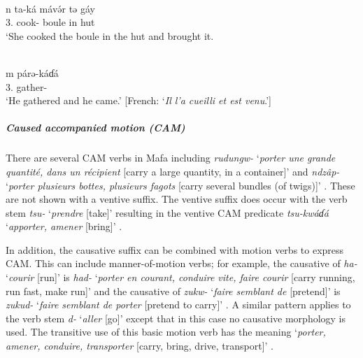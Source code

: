 \ea\label{ex2:mafa3}
 \\
\gll  n ta-ká mávə́r tə gáy	\\
3. cook- boule in hut \\
\glt `She cooked the boule in the hut and brought it.  

\ex\label{ex2:mafa4}
 \\
\gll  m párə-káɗá	\\
3. gather-\\
\glt `He gathered and he came.' [French: `\textit{Il l'a cueilli et est venu}.']
\z 

\subparagraph{Caused accompanied motion (CAM)}

There are several CAM verbs in Mafa including \textit{rudungw-} `\textit{porter une grande quantité, dans un récipient} [carry a large quantity, in a container]' and \textit{ndzâp-} `\textit{porter plusieurs bottes, plusieurs fagots} [carry several bundles (of twigs)]' \citep[291, 314]{barreteauLexiqueMafaLangue1990}. These are not shown with a ventive suffix. The ventive suffix does occur with the verb stem \textit{tsu-} `\textit{prendre} [take]' resulting in the ventive CAM predicate \textit{tsu-kwáɗá} `\textit{apporter, amener} [bring]' \citep[359]{barreteauLexiqueMafaLangue1990}.

\largerpage[-2]
In addition, the causative suffix can be combined with motion verbs to express CAM. This can include manner-of-motion verbs; for example, the causative of \textit{ha-} `\textit{courir} [run]' is \textit{had-} `\textit{porter en courant, conduire vite, faire courir} [carry running, run fast, make run]' and the causative of \textit{zukw-} `\textit{faire semblant de} [pretend]' is \textit{zukud-} `\textit{faire semblant de porter} [pretend to carry]'  \citep[44, 165, 390]{barreteauLexiqueMafaLangue1990}. A similar pattern applies to the verb stem \textit{d-} `\textit{aller} [go]' except that in this case no causative morphology is used. The transitive use of this basic motion verb has the meaning `\textit{porter, amener, conduire, transporter} [carry, bring, drive, transport]' \citep[106]{barreteauLexiqueMafaLangue1990}.

